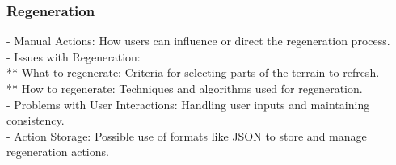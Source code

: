 
\subsubsection{Regeneration}
- Manual Actions: How users can influence or direct the regeneration process. \\
- Issues with Regeneration: \\
** What to regenerate: Criteria for selecting parts of the terrain to refresh. \\
** How to regenerate: Techniques and algorithms used for regeneration. \\
- Problems with User Interactions: Handling user inputs and maintaining consistency. \\
- Action Storage: Possible use of formats like JSON to store and manage regeneration actions.

